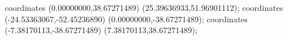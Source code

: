  coordinates {(0.00000000,38.67271489) (25.39636933,51.96901112)};
 coordinates {(-24.53363067,-52.45236890) (0.00000000,-38.67271489)};
 coordinates {(-7.38170113,-38.67271489) (7.38170113,38.67271489)};
